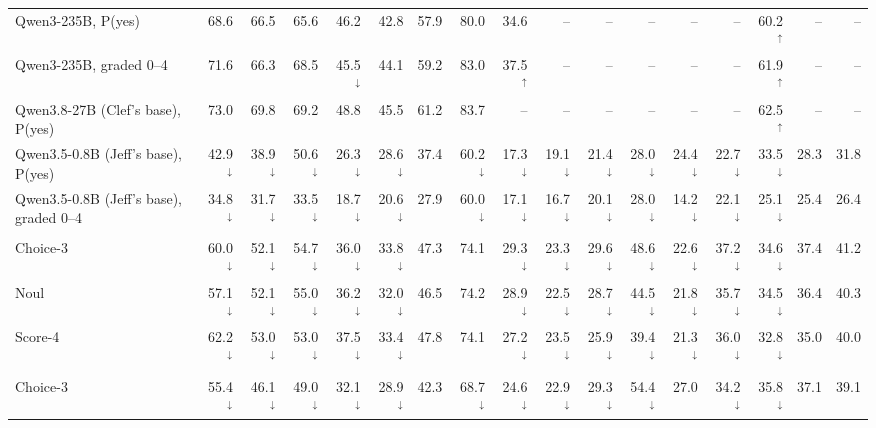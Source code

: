\begin{table}[t]
\begin{tabular}{lrrrrr|r|rrrrrrrr|r|r}
Qwen3-235B, P(yes) & 68.6 & 66.5 & 65.6 & 46.2 & 42.8 & 57.9 & 80.0 & 34.6 & -- & -- & -- & -- & -- & 60.2$^\uparrow$ & -- & -- \\
Qwen3-235B, graded 0--4 & 71.6 & 66.3 & 68.5 & 45.5$^\downarrow$ & 44.1 & 59.2 & 83.0 & 37.5$^\uparrow$ & -- & -- & -- & -- & -- & 61.9$^\uparrow$ & -- & -- \\
Qwen3.8-27B (Clef's base), P(yes) & 73.0 & 69.8 & 69.2 & 48.8 & 45.5 & 61.2 & 83.7 & -- & -- & -- & -- & -- & -- & 62.5$^\uparrow$ & -- & -- \\
Qwen3.5-0.8B (Jeff's base), P(yes) & 42.9$^\downarrow$ & 38.9$^\downarrow$ & 50.6$^\downarrow$ & 26.3$^\downarrow$ & 28.6$^\downarrow$ & 37.4 & 60.2$^\downarrow$ & 17.3$^\downarrow$ & 19.1$^\downarrow$ & 21.4$^\downarrow$ & 28.0$^\downarrow$ & 24.4$^\downarrow$ & 22.7$^\downarrow$ & 33.5$^\downarrow$ & 28.3 & 31.8 \\
Qwen3.5-0.8B (Jeff's base), graded 0--4 & 34.8$^\downarrow$ & 31.7$^\downarrow$ & 33.5$^\downarrow$ & 18.7$^\downarrow$ & 20.6$^\downarrow$ & 27.9 & 60.0$^\downarrow$ & 17.1$^\downarrow$ & 16.7$^\downarrow$ & 20.1$^\downarrow$ & 28.0$^\downarrow$ & 14.2$^\downarrow$ & 22.1$^\downarrow$ & 25.1$^\downarrow$ & 25.4 & 26.4 \\
\addlinespace[1pt]
\multicolumn{17}{l}{\textit{Laya (421M)}} \\
\quad Choice-3 & 60.0$^\downarrow$ & 52.1$^\downarrow$ & 54.7$^\downarrow$ & 36.0$^\downarrow$ & 33.8$^\downarrow$ & 47.3 & 74.1 & 29.3$^\downarrow$ & 23.3$^\downarrow$ & 29.6$^\downarrow$ & 48.6$^\downarrow$ & 22.6$^\downarrow$ & 37.2$^\downarrow$ & 34.6$^\downarrow$ & 37.4 & 41.2 \\
\quad Noul & 57.1$^\downarrow$ & 52.1$^\downarrow$ & 55.0$^\downarrow$ & 36.2$^\downarrow$ & 32.0$^\downarrow$ & 46.5 & 74.2 & 28.9$^\downarrow$ & 22.5$^\downarrow$ & 28.7$^\downarrow$ & 44.5$^\downarrow$ & 21.8$^\downarrow$ & 35.7$^\downarrow$ & 34.5$^\downarrow$ & 36.4 & 40.3 \\
\quad Score-4 & 62.2$^\downarrow$ & 53.0$^\downarrow$ & 53.0$^\downarrow$ & 37.5$^\downarrow$ & 33.4$^\downarrow$ & 47.8 & 74.1 & 27.2$^\downarrow$ & 23.5$^\downarrow$ & 25.9$^\downarrow$ & 39.4$^\downarrow$ & 21.3$^\downarrow$ & 36.0$^\downarrow$ & 32.8$^\downarrow$ & 35.0 & 40.0 \\
\addlinespace[1pt]
\multicolumn{17}{l}{\textit{Jeff (0.8B)}} \\
\quad Choice-3 & 55.4$^\downarrow$ & 46.1$^\downarrow$ & 49.0$^\downarrow$ & 32.1$^\downarrow$ & 28.9$^\downarrow$ & 42.3 & 68.7$^\downarrow$ & 24.6$^\downarrow$ & 22.9$^\downarrow$ & 29.3$^\downarrow$ & 54.4$^\downarrow$ & 27.0 & 34.2$^\downarrow$ & 35.8$^\downarrow$ & 37.1 & 39.1 \\

\end{tabular}
\end{table}
